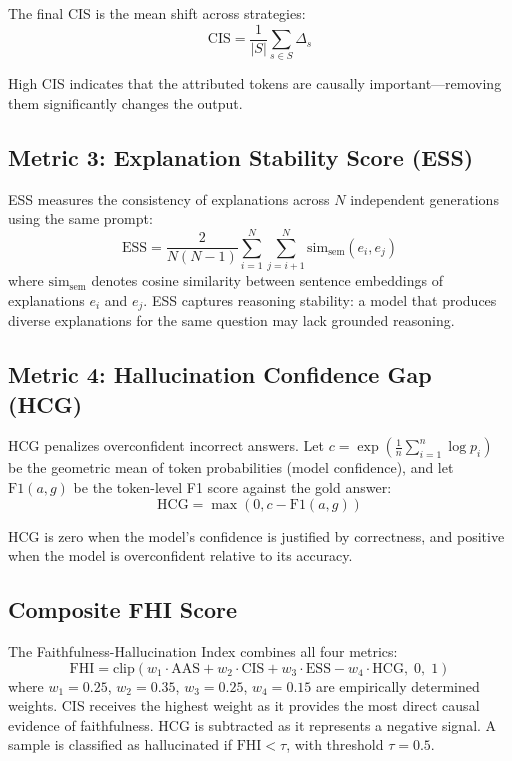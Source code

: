 The final CIS is the mean shift across strategies:
\begin{equation}
    \text{CIS} = \frac{1}{|S|} \sum_{s \in S} \Delta_s
\end{equation}

High CIS indicates that the attributed tokens are causally important---removing them significantly changes the output.

\subsection{Metric 3: Explanation Stability Score (ESS)}

ESS measures the consistency of explanations across $N$ independent generations using the same prompt:
\begin{equation}
    \text{ESS} = \frac{2}{N(N-1)} \sum_{i=1}^{N} \sum_{j=i+1}^{N} \text{sim}_{\text{sem}}(e_i, e_j)
\end{equation}
where $\text{sim}_{\text{sem}}$ denotes cosine similarity between sentence embeddings of explanations $e_i$ and $e_j$. ESS captures reasoning stability: a model that produces diverse explanations for the same question may lack grounded reasoning.

\subsection{Metric 4: Hallucination Confidence Gap (HCG)}

HCG penalizes overconfident incorrect answers. Let $c = \exp\left(\frac{1}{n}\sum_{i=1}^{n} \log p_i\right)$ be the geometric mean of token probabilities (model confidence), and let $\text{F1}(a, g)$ be the token-level F1 score against the gold answer:
\begin{equation}
    \text{HCG} = \max(0, c - \text{F1}(a, g))
\end{equation}

HCG is zero when the model's confidence is justified by correctness, and positive when the model is overconfident relative to its accuracy.

\subsection{Composite FHI Score}

The Faithfulness-Hallucination Index combines all four metrics:
\begin{equation}
    \text{FHI} = \text{clip}\left(w_1 \cdot \text{AAS} + w_2 \cdot \text{CIS} + w_3 \cdot \text{ESS} - w_4 \cdot \text{HCG},\; 0,\; 1\right)
    \label{eq:fhi}
\end{equation}
where $w_1 = 0.25$, $w_2 = 0.35$, $w_3 = 0.25$, $w_4 = 0.15$ are empirically determined weights. CIS receives the highest weight as it provides the most direct causal evidence of faithfulness. HCG is subtracted as it represents a negative signal. A sample is classified as hallucinated if $\text{FHI} < \tau$, with threshold $\tau = 0.5$.
